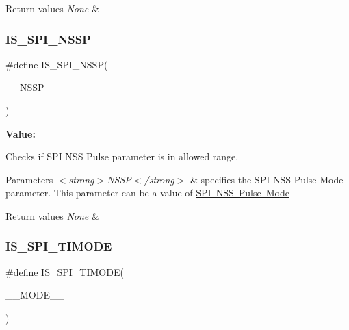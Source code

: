 \begin{DoxyRetVals}{Return values}
{\em None} & \\
\hline
\end{DoxyRetVals}
\mbox{\label{group___s_p_i___private___macros_ga59317f70e75953c1c2f7d1d67d173db1}} 
\subsubsection{\texorpdfstring{IS\_SPI\_NSSP}{IS\_SPI\_NSSP}}
{\footnotesize\ttfamily \#define I\+S\+\_\+\+S\+P\+I\+\_\+\+N\+S\+SP(\begin{DoxyParamCaption}\item[{}]{\+\_\+\+\_\+\+N\+S\+S\+P\+\_\+\+\_\+ }\end{DoxyParamCaption})}

{\bfseries Value\+:}
\begin{DoxyCode}{0}

\end{DoxyCode}


Checks if S\+PI N\+SS Pulse parameter is in allowed range. 


\begin{DoxyParams}{Parameters}
{\em $<$strong$>$\+N\+S\+S\+P$<$/strong$>$} & specifies the S\+PI N\+SS Pulse Mode parameter. This parameter can be a value of \mbox{\hyperlink{group___s_p_i___n_s_s_p___mode}{S\+PI N\+SS Pulse Mode}} \\
\hline
\end{DoxyParams}

\begin{DoxyRetVals}{Return values}
{\em None} & \\
\hline
\end{DoxyRetVals}
\mbox{\label{group___s_p_i___private___macros_ga8e3c348af57cf973277018958fccfed9}} 
\subsubsection{\texorpdfstring{IS\_SPI\_TIMODE}{IS\_SPI\_TIMODE}}
{\footnotesize\ttfamily \#define I\+S\+\_\+\+S\+P\+I\+\_\+\+T\+I\+M\+O\+DE(\begin{DoxyParamCaption}\item[{}]{\+\_\+\+\_\+\+M\+O\+D\+E\+\_\+\+\_\+ }\end{DoxyParamCaption})}

